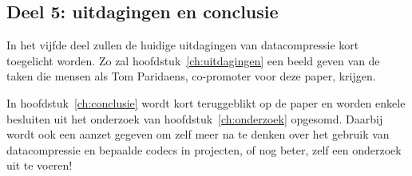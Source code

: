 \subsection{Deel 5: uitdagingen en conclusie}
\label{sec:opzet-bachelorproef-deel-5}

In het vijfde deel zullen de huidige uitdagingen van \gls{datacompressie} kort toegelicht worden. Zo zal hoofdstuk~\ref{ch:uitdagingen} een beeld geven van de taken die mensen als Tom Paridaens, co-promoter voor deze paper, krijgen.

In hoofdstuk~\ref{ch:conclusie} wordt kort teruggeblikt op de paper en worden enkele besluiten uit het onderzoek van hoofdstuk~\ref{ch:onderzoek} opgesomd. Daarbij wordt ook een aanzet gegeven om zelf meer na te denken over het gebruik van \gls{datacompressie} en bepaalde  \glspl{codec} in projecten, of nog beter, zelf een onderzoek uit te voeren!
